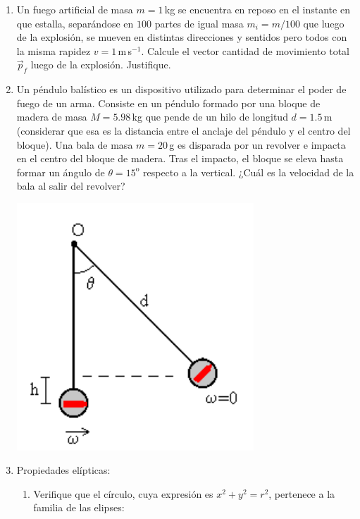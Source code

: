 \documentclass[a4paper,12pt]{article}
\begin{document}
\begin{enumerate}
  \item Un fuego artificial de masa $m=1$\,kg se encuentra en reposo en el instante en que estalla, separándose en $100$ partes de igual masa $m_i=m/100$ que luego de la explosión, se mueven en distintas direcciones y sentidos pero todos con la misma rapidez $v=1$\,m\,s$^{-1}$. Calcule el vector cantidad de movimiento total $\vec p_f$ luego de la explosión. Justifique.
    \vspace{-2.5cm}
  \item
    \begin{minipage}[t]{0.695\textwidth}
      Un péndulo balístico es un dispositivo utilizado para determinar el poder de fuego de un arma. Consiste en un péndulo formado por una bloque de madera de masa $M=5.98$\,kg que pende de un hilo de longitud $d=1.5$\,m (considerar que esa es la distancia entre el anclaje del péndulo y el centro del bloque). Una bala de masa $m=20$\,g es disparada por un revolver e impacta en el centro del bloque de madera. Tras el impacto, el bloque se eleva hasta formar un ángulo de $\theta=15^\mathrm{o}$ respecto a la vertical. ¿Cuál es la velocidad de la bala al salir del revolver?
    \end{minipage}
    \begin{minipage}[]{0.295\textwidth}
      \vspace{2.5cm}
      \includegraphics[width=0.7\textwidth]{balistico.png}
    \end{minipage}
  \item Propiedades elípticas: 
    \begin{enumerate}
      \item Verifique que el círculo, cuya expresión es $x^2 + y^2 = r^2$, pertenece a la familia de las elipses: 

\end{enumerate}
\end{enumerate}
\end{document}
